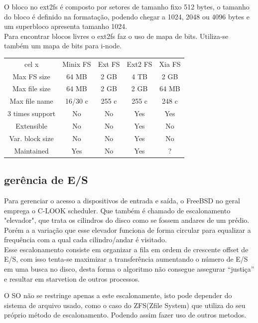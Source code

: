 \documentclass[conference]{IEEEtran}
\begin{document}
O bloco no ext2fs é composto por setores de tamanho fixo 512 bytes, o tamanho do bloco é definido na formatação, podendo chegar a 1024, 2048 ou 4096 bytes e um superbloco apresenta tamanho 1024. \\ 
Para encontrar blocos livres o ext2fs faz o uso de mapa de bits. Utiliza-se também um mapa de bits para i-node.\\ 

\begin{center}
	\begin{tabular}{c|c|c|c|c}
		\hline
		cel x & Minix FS & Ext FS & Ext2 FS & Xia FS \\
		Max FS size & 64 MB & 2 GB & 4 TB & 2 GB \\
		Max file size & 64 MB & 2 GB & 2 GB & 64 MB \\
		Max file name & 16/30 c & 255 c &255 c & 248 c \\
		3 times support & No & No & Yes & Yes \\
		Extensible & No & No & Yes & No \\
		Var. block size & No & No & Yes & No \\
		Maintained & Yes & No & Yes & ?
	\end{tabular}
\end{center}

\subsection{gerência de E/S}\label{sec:BSDES}
Para gerenciar o acesso a dispositivos de entrada e saída, o FreeBSD no geral emprega o C-LOOK scheduler\cite{FreeBSD-Hybrid}. Que também é chamado de escalonamento "elevador", que trata os cilindros do disco como se fossem andares de um prédio. Porém a a variação que esse elevador funciona de forma circular para equalizar a frequência com a qual cada cilindro/andar é visitado.\\

Esse escalonamento consiste em organizar a fila em ordem de crescente offset de E/S, com isso tenta-se maximizar a transferência aumentando o número de E/S em uma busca no disco, desta forma o algoritmo não consegue assegurar “justiça” e resultar em starvetion de outros processos.
 
O SO não se restringe apenas a este escalonamente, isto pode depender do sistema de arquivo usado, como o caso do ZFS(Zfile System) que utiliza do seu próprio método de escalonamento. Podendo assim fazer uso de outros metodos. \\
\end{document}
